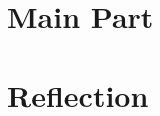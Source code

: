 \documentclass[headings=standardclasses]{scrbook}
\theoremstyle{remark}
\begin{document}
\part{Main Part}




\part{Reflection}




\printbibliography

\begin{appendices}
    
\end{appendices}
\end{document}
